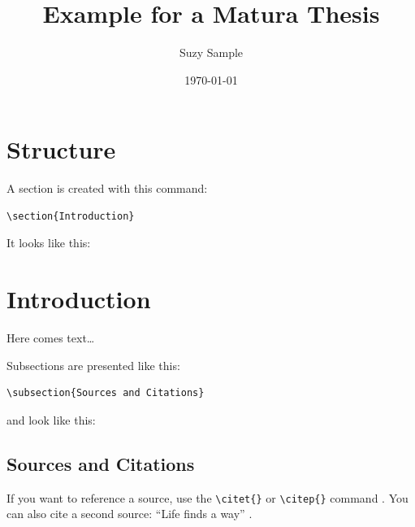\documentclass[12pt,a4paper]{article} %
\title{Example for a Matura Thesis}
\date{\today}
\author{Suzy Sample}
\begin{document}
\maketitle %
% 

\newpage %
\tableofcontents %

\newpage

\section{Structure}

A section is created with this command:
\begin{verbatim}
\section{Introduction}
\end{verbatim}

It looks like this:

\section{Introduction}
Here comes text\ldots 

Subsections are presented like this:

\begin{verbatim}
\subsection{Sources and Citations}
\end{verbatim}

and look like this:

\subsection{Sources and Citations}


If you want to reference a source, use the \verb|\citet{}| or \verb|\citep{}| command \citep{example}. You can also cite a second source: “Life finds a way” \citep{buch2}.
\end{document}
